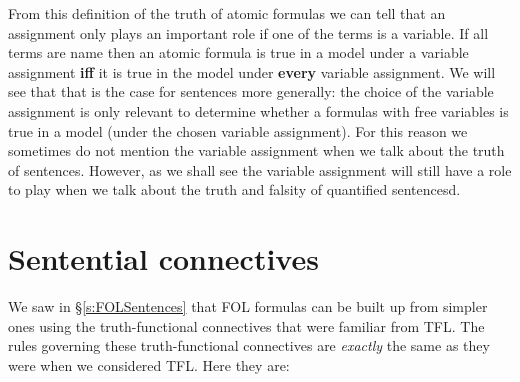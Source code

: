 From this definition of the truth of atomic formulas we can tell that an assignment only plays an important role if one of the terms is a variable. If all terms are name then an atomic formula is true in a model under a variable assignment \textbf{iff} it is true in the model under \textbf{every} variable assignment. We will see that that is the case for sentences more generally: the choice of the variable assignment is only relevant to determine whether a formulas with free variables is true in a model (under the chosen variable assignment). For this reason we sometimes do not mention the variable assignment when we talk about the truth of sentences. However, as we shall see the variable assignment will still have a role to play when we talk about the truth and falsity of quantified sentencesd.

\section{Sentential connectives}
We saw in \S\ref{s:FOLSentences} that FOL formulas can be built up from simpler ones using the truth-functional connectives that were familiar from TFL. The rules governing these truth-functional connectives are \emph{exactly} the same as they were when we considered TFL. Here they are:
